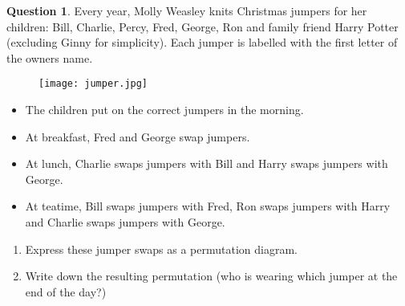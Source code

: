 \documentclass[a4paper,12pt]{article}
\theoremstyle{definition}
\newtheorem{question}{Question}%
\theoremstyle{remark}
\begin{document}
\begin{question} Every year, Molly Weasley knits Christmas jumpers for her children: Bill, Charlie, Percy, Fred, George, Ron and family friend Harry Potter (excluding Ginny for simplicity). Each jumper is labelled with the first letter of the owners name. 

  \begin{figure}[h]
    \centering
    \texttt{[image: jumper.jpg]}
  \end{figure}

  \begin{itemize}
  \item The children put on the correct jumpers in the morning. 
    \item At breakfast, Fred and George swap jumpers. 
      \item At lunch, Charlie swaps jumpers with Bill and Harry swaps jumpers with George.
        \item At teatime, Bill swaps jumpers with Fred, Ron swaps jumpers with Harry and Charlie swaps jumpers with George. 
  \end{itemize}
  \begin{enumerate}
  \item Express these jumper swaps as a permutation diagram. 
    \item Write down the resulting permutation (who is wearing which jumper at the end of the day?)
  \end{enumerate}

\end{question}




\clearpage
\end{document}

